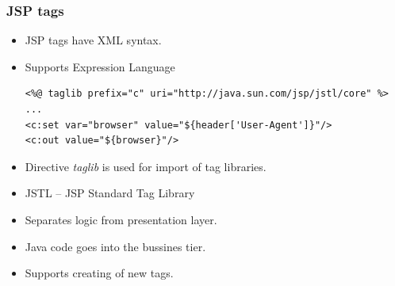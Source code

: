 \documentclass[10pt,xcolor=pdflatex]{beamer}
\begin{document}
\begin{frame}[containsverbatim]\frametitle{JSP tags}
	\begin{itemize}
		\item JSP tags have XML syntax.
		\item Supports Expression Language
        \begin{footnotesize}\begin{verbatim}
<%@ taglib prefix="c" uri="http://java.sun.com/jsp/jstl/core" %>
...
<c:set var="browser" value="${header['User-Agent']}"/>
<c:out value="${browser}"/>
        \end{verbatim}
        \end{footnotesize}
        \item Directive \emph{taglib} is used for import of tag libraries.
		\item JSTL -- JSP Standard Tag Library
		\item Separates logic from presentation layer.
		\item Java code goes into the bussines tier.
		\item Supports creating of new tags.
    \end{itemize}
\end{frame}
\end{document}
